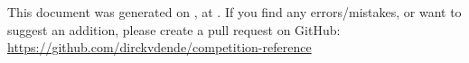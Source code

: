 \documentclass[dvipsnames]{article}
\begin{document}

{
    \color{gray}
    \setlength\topsep{0pt}
    \setlength\parskip{0pt}
    \begin{center}
        This document was generated on \DTMtoday, at \DTMcurrenttime. If you find any errors/mistakes, or want to suggest an addition, please create a pull request on GitHub: \url{https://github.com/dirckvdende/competition-reference}
    \end{center}
}

\label{LastPage}
\end{document}
